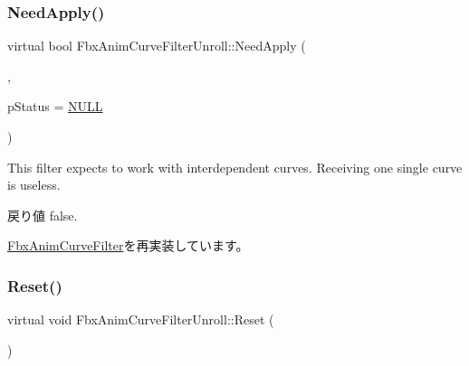 \mbox{\label{class_fbx_anim_curve_filter_unroll_adbe1626e507eb312b994b38403a11a19}} 
\subsubsection{\texorpdfstring{Need\+Apply()}{NeedApply()}\hspace{0.1cm}{\footnotesize\ttfamily [5/5]}}
{\footnotesize\ttfamily virtual bool Fbx\+Anim\+Curve\+Filter\+Unroll\+::\+Need\+Apply (\begin{DoxyParamCaption}\item[{\hyperlink{class_fbx_anim_curve}{Fbx\+Anim\+Curve} \&}]{,  }\item[{\hyperlink{class_fbx_status}{Fbx\+Status} $\ast$}]{p\+Status = {\ttfamily \hyperlink{fbxarch_8h_a070d2ce7b6bb7e5c05602aa8c308d0c4}{N\+U\+LL}} }\end{DoxyParamCaption})\hspace{0.3cm}{\ttfamily [virtual]}}

This filter expects to work with interdependent curves. Receiving one single curve is useless. \begin{DoxyReturn}{戻り値}
{\ttfamily false}. 
\end{DoxyReturn}


\hyperlink{class_fbx_anim_curve_filter_af768a9c47e4f5a5fff47a8ec781e6b4c}{Fbx\+Anim\+Curve\+Filter}を再実装しています。

\mbox{\label{class_fbx_anim_curve_filter_unroll_a0587dd664dddb98a809043f030b409d6}} 
\subsubsection{\texorpdfstring{Reset()}{Reset()}}
{\footnotesize\ttfamily virtual void Fbx\+Anim\+Curve\+Filter\+Unroll\+::\+Reset (\begin{DoxyParamCaption}{ }\end{DoxyParamCaption})\hspace{0.3cm}{\ttfamily [virtual]}}

